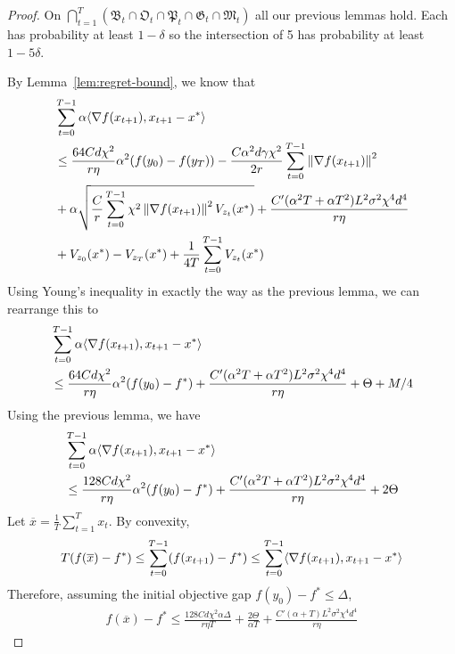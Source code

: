 \begin{proof}
    On $\bigcap_{t=1}^{T} (\mathfrak B_t \cap \mathfrak O_t \cap \mathfrak P_t \cap \mathfrak G_t \cap \mathfrak M_t)$ all our previous lemmas hold. Each has probability at least $1-\delta$ so the intersection of 5 has probability at least $1-5\delta$. 

    By Lemma~\ref{lem:regret-bound}, we know that
    \begin{align*}
        &\sum_{t=0}^{T-1} \alpha \langle \nabla f(x_{t+1}), x_{t+1}-x^* \rangle
        \\&\leq \frac{64Cd \chi^2}{r \eta} \alpha^2(f(y_0) - f(y_{T})) -\frac{C\alpha^2d\gamma \chi^2}{2r} \sum_{t=0}^{T-1} \left\lVert \nabla f(x_{t+1}) \right\rVert^2  \\
        &+\alpha \sqrt{ \frac C r \sum_{t=0}^{T-1} \chi^2 \left\lVert \nabla f(x_{t+1}) \right\rVert^2 V_{z_t}(x^*)} + \frac{C'(\alpha^2 T+\alpha T^2)  L^2 \sigma^2 \chi^4 d^4}{r\eta}  \\
        &+ V_{z_0}(x^*) - V_{z_T}(x^*) + \frac{1}{4T} \sum_{t=0}^{T-1} V_{z_t}(x^*)
    \end{align*}
    Using Young's inequality in exactly the way as the previous lemma, we can rearrange this to
    \begin{align*}
        &\sum_{t=0}^{T-1} \alpha \langle \nabla f(x_{t+1}), x_{t+1}-x^* \rangle
        \\&\leq \frac{64Cd \chi^2}{r \eta} \alpha^2(f(y_0) - f^*) + \frac{C'(\alpha^2 T + \alpha T^2) L^2 \sigma^2 \chi^4 d^4}{r\eta} + \Theta + M/4 \\
    \end{align*}
    Using the previous lemma, we have
    \begin{align*}
        &\sum_{t=0}^{T-1} \alpha \langle \nabla f(x_{t+1}), x_{t+1}-x^* \rangle \\
        &\leq \frac{128Cd\chi^2}{r\eta} \alpha^2 (f(y_0) - f^*) + \frac{C'(\alpha^2 T + \alpha T^2) L^2 \sigma^2 \chi^4 d^4}{r\eta} + 2\Theta
    \end{align*}
    Let $\overline x = \frac{1}{T}\sum_{t=1}^{T}x_t$. By convexity,
    \begin{align*}
        T(f(\overline x)-f^*) \leq \sum_{t=0}^{T-1} (f(x_{t+1})-f^*) \leq \sum_{t=0}^{T-1} \langle \nabla f(x_{t+1}), x_{t+1}-x^* \rangle
    \end{align*}
    Therefore, assuming the initial objective gap $f(y_0) - f^* \leq \Delta$,
    \begin{align*}
        f(\overline x) - f^* \leq \frac{128Cd\chi^2 \alpha \Delta }{r\eta T} + \frac{2\Theta}{\alpha T} + \frac{C'(\alpha + T) L^2 \sigma^2 \chi^4 d^4}{r\eta}

\end{align*}
\end{proof}
